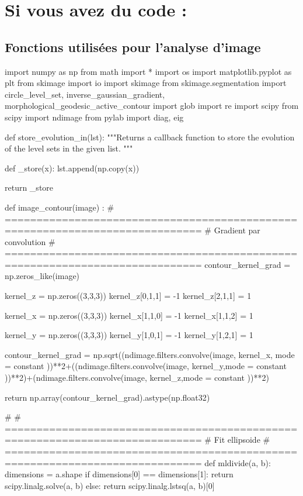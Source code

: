 \chapter{Si vous avez du code : }
		\section{Fonctions utilisées pour l'analyse d'image}
		\label{chap_annexe:code_fonction_analyse}
\begin{customFrame}
import numpy as np
from math import *
import os
import matplotlib.pyplot as plt
from skimage import io
import skimage
from skimage.segmentation import circle_level_set, inverse_gaussian_gradient, morphological_geodesic_active_contour
import glob
import re
import scipy
from scipy import ndimage
from pylab import diag, eig

def store_evolution_in(lst):
    """Returns a callback function to store the evolution of the level sets in
    the given list.
    """

    def _store(x):
        lst.append(np.copy(x))

    return _store
      

def image_contour(image) :
# =============================================================================
#     Gradient par convolution 
# =============================================================================
    contour_kernel_grad = np.zeros_like(image)

    kernel_z = np.zeros((3,3,3))
    kernel_z[0,1,1] = -1
    kernel_z[2,1,1] = 1
    
    kernel_x = np.zeros((3,3,3))
    kernel_x[1,1,0] = -1
    kernel_x[1,1,2] = 1
    
    kernel_y = np.zeros((3,3,3))
    kernel_y[1,0,1] = -1
    kernel_y[1,2,1] = 1    
    
    contour_kernel_grad = np.sqrt((ndimage.filters.convolve(image, kernel_x, mode =  constant ))**2+((ndimage.filters.convolve(image, kernel_y,mode =  constant ))**2)+(ndimage.filters.convolve(image, kernel_z,mode =  constant ))**2)
    
    
    return np.array(contour_kernel_grad).astype(np.float32)

#  
# =============================================================================
# Fit ellipsoide
# =============================================================================
def mldivide(a, b):
    dimensions = a.shape
    if dimensions[0] == dimensions[1]:
        return scipy.linalg.solve(a, b)
    else:
        return scipy.linalg.lstsq(a, b)[0] 
        

\end{customFrame}
